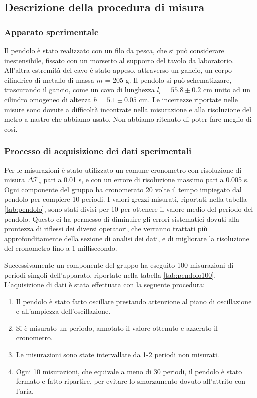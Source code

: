 \subsection{Descrizione della procedura di misura}

\subsubsection{Apparato sperimentale}

Il pendolo è stato realizzato con un filo da pesca, che si può considerare
inestensibile, fissato con un morsetto al supporto del tavolo da laboratorio.
All'altra estremità del cavo è stato appeso, attraverso un gancio, un corpo
cilindrico di metallo di massa $m$ = 205 g. Il pendolo si può schematizzare,
trascurando il gancio, come un cavo di lunghezza $l_c = 55.8 \pm 0.2$ 
cm unito ad un cilindro omogeneo di altezza $h = 5.1 \pm 0.05$ cm.
Le incertezze riportate nelle misure sono dovute a difficoltà incontrate nella
misurazione e alla risoluzione del metro a nastro che abbiamo usato.
Non abbiamo ritenuto di poter fare meglio di così.

\subsubsection{Processo di acquisizione dei dati sperimentali}

Per le misurazioni è stato utilizzato un comune cronometro con risoluzione di
misura $\Delta\mathcal{T}_{s}$ pari a 0.01 s, e con un errore di risoluzione massimo pari a 0.005 s. Ogni componente del gruppo ha
cronomerato 20 volte il tempo impiegato dal pendolo per compiere 10 periodi.
I valori grezzi misurati, riportati nella tabella \ref{tab:pendolo}, sono stati divisi per
10 per ottenere il valore medio del periodo del pendolo. Questo ci ha permesso
di diminuire gli errori sistematici dovuti alla prontezza di riflessi dei diversi
operatori, che verranno trattati più approfonditamente della sezione di analisi dei
dati, e di migliorare la risoluzione del cronometro fino a 1 millisecondo.

Successivamente un componente del gruppo ha eseguito 100 misurazioni di periodi
singoli dell'apparato, riportate nella tabella \ref{tab:pendolo100}. L'aquisizione di dati è stata
effettuata con la seguente procedura:

\begin{enumerate}
    \item{Il pendolo è stato fatto oscillare prestando attenzione al piano di oscillazione
        e all'ampiezza dell'oscillazione.}

    \item{Si è misurato un periodo, annotato il valore ottenuto e azzerato il cronometro.}

    \item{Le misurazioni sono state intervallate da 1-2 periodi non misurati.}

    \item{Ogni 10 misurazioni, che equivale a meno di 30 periodi, il pendolo è stato fermato
        e fatto ripartire, per evitare lo smorzamento dovuto all'attrito con l'aria.}
\end{enumerate}

